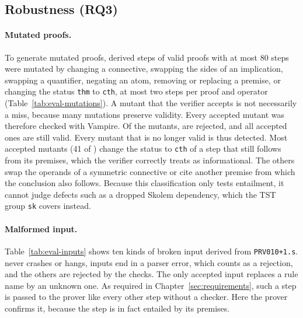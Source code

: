 \subsection{Robustness (RQ3)}
\label{subsec:eval-robustness}

\paragraph{Mutated proofs.}
To generate mutated proofs, derived steps of \EvalMutProofs{} valid proofs with at most 80 steps were mutated by changing a connective, swapping the sides of an implication, swapping a quantifier, negating an atom, removing or replacing a premise, or changing the status \texttt{thm} to \texttt{cth}, at most two steps per proof and operator (Table~\ref{tab:eval-mutations}).
A mutant that the verifier accepts is not necessarily a miss, because many mutations preserve validity. Every accepted mutant was therefore checked with Vampire.
Of the \EvalMutN{} mutants, \EvalMutKilled{} are rejected, and all \EvalMutEq{} accepted ones are still valid. Every mutant that is no longer valid is thus detected.
Most accepted mutants (41 of \EvalMutEq{}) change the status to \texttt{cth} of a step that still follows from its premises, which the verifier correctly treats as informational. The others swap the operands of a symmetric connective or cite another premise from which the conclusion also follows.
Because this classification only tests entailment, it cannot judge defects such as a dropped Skolem dependency, which the TST group \texttt{sk} covers instead.

\begin{table}[!htb]
\centering
\small
\caption{Mutation operators and outcomes. Every accepted mutant was checked with Vampire and is still valid. The detection rate is therefore the share of rejected mutants among those that are no longer valid.}
\label{tab:eval-mutations}

\end{table}

\paragraph{Malformed input.}
Table~\ref{tab:eval-inputs} shows ten kinds of broken input derived from \texttt{PRV010+1.s}.
\TSTPy{} never crashes or hangs, \EvalInputsCrash{} inputs end in a parser error, which counts as a rejection, and the others are rejected by the checks.
The only accepted input replaces a rule name by an unknown one. As required in Chapter~\ref{sec:requirements}, such a step is passed to the prover like every other step without a checker. Here the prover confirms it, because the step is in fact entailed by its premises.


